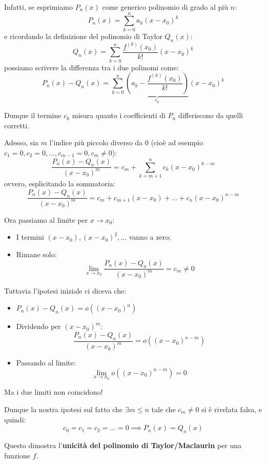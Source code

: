 \documentclass[12pt]{report}
\begin{document}
	\begin{dimostrazione}{}{}
		
		Infatti, se esprimiamo $P_n(x)$ come generico polinomio di grado al più $n$:
		\[
		P_n(x) = \sum_{k=0}^n a_k(x - x_0)^k
		\]
		e ricordando la definizione del polinomio di Taylor $Q_n(x)$:
		\[
		Q_n(x) = \sum_{k=0}^n \frac{f^{(k)}(x_0)}{k!}(x - x_0)^k
		\]
		possiamo scrivere la differenza tra i due polinomi come:
		\[
		P_n(x) - Q_n(x) = \sum_{k=0}^n \underbrace{\left(a_k - \frac{f^{(k)}(x_0)}{k!}\right)}_{c_k} (x - x_0)^k
		\]
		
		Dunque il termine $c_k$ misura quanto i coefficienti di $P_n$ differiscono da quelli corretti.
		
		Adesso, sia $m$ l'indice più piccolo diverso da $0$ (cioè ad esempio $c_1 = 0, c_2 = 0, \dots, c_{m-1} = 0, c_m \neq 0$):
		\[
		\frac{P_n(x) - Q_n(x)}{(x-x_0)^m} = c_m + \sum_{k=m+1}^{n} c_k (x-x_0)^{k-m}
		\]
		ovvero, esplicitando la sommatoria:
		\[
		\frac{P_n(x) - Q_n(x)}{(x-x_0)^m} = c_m + c_{m+1}(x-x_0) + \dots + c_n(x-x_0)^{n-m}
		\]
		
		Ora passiamo al limite per $x \to x_0$:
		\begin{itemize}
			
			\item I termini $(x-x_0), (x-x_0)^2, \dots$ vanno a zero;
			
			\item Rimane solo:
			\[
			\lim_{x \to x_0} \frac{P_n(x) - Q_n(x)}{(x-x_0)^m} = c_m \neq 0
			\]
			
		\end{itemize}
		
		Tuttavia l'ipotesi iniziale ci diceva che:
		\begin{itemize}
			
			\item $P_n(x) - Q_n(x) = o((x-x_0)^n)$
			
			\item Dividendo per $(x-x_0)^m$:
			\[
			\frac{P_n(x) - Q_n(x)}{(x-x_0)^m} = o((x-x_0)^{n-m})
			\]
			
			\item Passando al limite:
			\[
			\lim_{x \to x_0} o((x-x_0)^{n-m}) = 0
			\]
			
		\end{itemize}
		
		Ma i due limiti non coincidono!
		
		Dunque la nostra ipotesi sul fatto che $\exists m \le n$ tale che $c_m \neq 0$ si è rivelata falsa, e quindi:
		\[
		c_0 = c_1 = c_2 = \dots = 0 \implies P_n(x) = Q_n(x)
		\]
		
		Questo dimostra l'\textbf{unicità del polinomio di Taylor/Maclaurin} per una funzione $f$.
		
	\end{dimostrazione}
	
\end{document}
